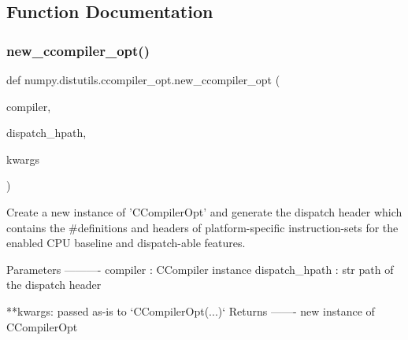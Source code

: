 \subsection{Function Documentation}
\mbox{\label{namespacenumpy_1_1distutils_1_1ccompiler__opt_a0024a946b633d7b74ad51236f7f49569}} 
\subsubsection{\texorpdfstring{new\+\_\+ccompiler\+\_\+opt()}{new\_ccompiler\_opt()}}
{\footnotesize\ttfamily def numpy.\+distutils.\+ccompiler\+\_\+opt.\+new\+\_\+ccompiler\+\_\+opt (\begin{DoxyParamCaption}\item[{}]{compiler,  }\item[{}]{dispatch\+\_\+hpath,  }\item[{}]{kwargs }\end{DoxyParamCaption})}

\begin{DoxyVerb}Create a new instance of 'CCompilerOpt' and generate the dispatch header
which contains the #definitions and headers of platform-specific instruction-sets for
the enabled CPU baseline and dispatch-able features.

Parameters
----------
compiler : CCompiler instance
dispatch_hpath : str
    path of the dispatch header

**kwargs: passed as-is to `CCompilerOpt(...)`
Returns
-------
new instance of CCompilerOpt
\end{DoxyVerb}
 